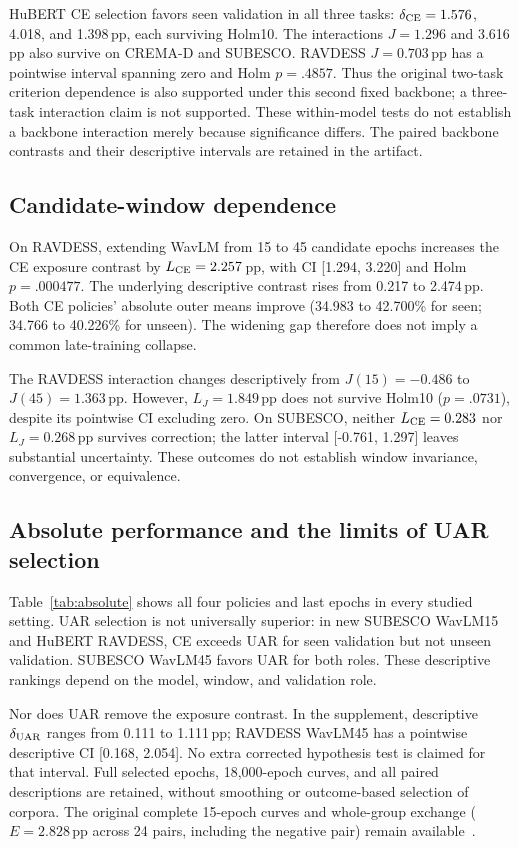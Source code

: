 \documentclass[letterpaper]{article}
\begin{document}
HuBERT CE selection favors seen validation in all three tasks: $\delta_{\rm CE}=1.576$, 4.018, and 1.398\,pp, each surviving Holm10. The interactions $J=1.296$ and 3.616\,pp also survive on CREMA-D and SUBESCO. RAVDESS $J=0.703$\,pp has a pointwise interval spanning zero and Holm $p=.4857$. Thus the original two-task criterion dependence is also supported under this second fixed backbone; a three-task interaction claim is not supported. These within-model tests do not establish a backbone interaction merely because significance differs. The paired backbone contrasts and their descriptive intervals are retained in the artifact.

\subsection{Candidate-window dependence}
On RAVDESS, extending WavLM from 15 to 45 candidate epochs increases the CE exposure contrast by $L_{\rm CE}=2.257$\,pp, with CI [1.294, 3.220] and Holm $p=.000477$. The underlying descriptive contrast rises from 0.217 to 2.474\,pp. Both CE policies' absolute outer means improve (34.983 to 42.700\% for seen; 34.766 to 40.226\% for unseen). The widening gap therefore does not imply a common late-training collapse.

The RAVDESS interaction changes descriptively from $J(15)=-0.486$ to $J(45)=1.363$\,pp. However, $L_J=1.849$\,pp does not survive Holm10 ($p=.0731$), despite its pointwise CI excluding zero. On SUBESCO, neither $L_{\rm CE}=0.283$ nor $L_J=0.268$\,pp survives correction; the latter interval [-0.761, 1.297] leaves substantial uncertainty. These outcomes do not establish window invariance, convergence, or equivalence.

\subsection{Absolute performance and the limits of UAR selection}
Table~\ref{tab:absolute} shows all four policies and last epochs in every studied setting. UAR selection is not universally superior: in new SUBESCO WavLM15 and HuBERT RAVDESS, CE exceeds UAR for seen validation but not unseen validation. SUBESCO WavLM45 favors UAR for both roles. These descriptive rankings depend on the model, window, and validation role.

Nor does UAR remove the exposure contrast. In the supplement, descriptive $\delta_{\rm UAR}$ ranges from 0.111 to 1.111\,pp; RAVDESS WavLM45 has a pointwise descriptive CI [0.168, 2.054]. No extra corrected hypothesis test is claimed for that interval. Full selected epochs, 18,000-epoch curves, and all paired descriptions are retained, without smoothing or outcome-based selection of corpora. The original complete 15-epoch curves and whole-group exchange ($E=2.828$\,pp across 24 pairs, including the negative pair) remain available~\cite{artifact}.
\end{document}
